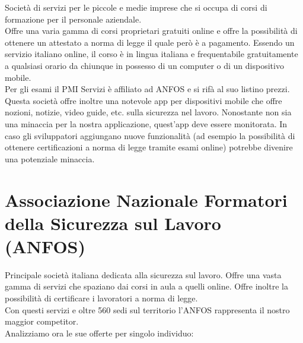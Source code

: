 Società di servizi per le piccole e medie imprese che si occupa di corsi di formazione per il personale aziendale.\\
Offre una varia gamma di corsi proprietari gratuiti online e offre la possibilità di ottenere un attestato a norma di legge il quale però è a pagamento. Essendo un servizio italiano online, il corso è in lingua italiana e frequentabile gratuitamente a qualsiasi orario da chiunque in possesso di un computer o di un dispositivo mobile.\\
Per gli esami il PMI Servizi è affiliato ad ANFOS e si rifà al suo listino prezzi.\\
Questa società offre inoltre  una notevole app per dispositivi mobile che offre nozioni, notizie, video guide, etc. sulla sicurezza nel lavoro. Nonostante non sia una minaccia per la nostra applicazione, quest'app deve essere monitorata. In caso gli sviluppatori aggiungano nuove funzionalità (ad esempio la possibilità di ottenere certificazioni a norma di legge tramite esami online) potrebbe divenire una potenziale minaccia.

\section*{Associazione Nazionale Formatori della Sicurezza sul Lavoro (ANFOS)}

Principale società italiana dedicata alla sicurezza sul lavoro. Offre una vasta gamma di servizi che spaziano dai corsi in aula a quelli online. Offre inoltre la possibilità di certificare i lavoratori a norma di legge.\\
Con questi servizi e oltre 560 sedi sul territorio l'ANFOS rappresenta il nostro maggior competitor.\\

Analizziamo ora le sue offerte per singolo individuo:


